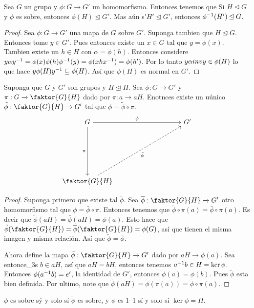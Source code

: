 \begin{lemma}\label{lemma_4.11}
    Sea $G$ un grupo y  $\phi:G \xrightarrow{} G'$ un homomorfismo. Entonces
    tenemos que Si $H \unlhd G$ y $\phi$ es sobre, entonces  $\phi(H) \unlhd G'$.
    Mas a\'un s\'$H' \unlhd G'$, entonces $\phi^{-1}(H') \unlhd G$.
\end{lemma}
\begin{proof}
    Sea $\phi:G \xrightarrow{} G'$ una mapa de $G$ sobre  $G'$. Suponga tambien
    que  $H \unlhd G$. Entonces tome  $y \in G'$. Pues entonces existe un  $x
    \in G$ tal que  $y=\phi(x)$. Tambien existe un $h \in H$ con
    $\alpha=\phi(h)$. Entonces considere
    $y\alpha y^{-1}=\phi(x)\phi(h)\phi^{-1}(y)=\phi(xhx^{-1})=\phi(h')$. Por
    lo tanto $y\alpha\\inv{y} \in \phi(H)$ lo que hace $y\phi(H)y^{-1}
    \subseteq \phi(H)$. As\'i que $\phi(H)$ es normal en $G'$.
\end{proof}

\begin{theorem}\label{thm_4.12}
    Suponga que $G$ y $G'$ son grupos y  $H \unlhd H$. Sea $\phi:G
    \xrightarrow{} G'$ y $\pi:G \xrightarrow{} \faktor{G}{H}$ dado por $\pi:a
    \xrightarrow{} aH$. Enotnces existe un u\'unico $\tilde{\phi}:\faktor{G}{H}
    \xrightarrow{} G'$ tal que $\phi=\tilde{\phi} \circ \pi$.
    \[\begin{tikzcd}
	G &&&& {G'} \\
	\\
	\\
	\\
	{\faktor{G}{H}}
	\arrow["\phi", from=1-1, to=1-5]
	\arrow["\pi"', from=1-1, to=5-1]
	\arrow["{\tilde{\phi}}"', dashed, from=5-1, to=1-5]
\end{tikzcd}\]
\end{theorem}
\begin{proof}
    Suponga primero que existe tal $\tilde{\phi}$. Sea $\bar{\phi}:\faktor{G}{H}
    \xrightarrow{} G'$ otro homomorfismo tal que $\phi=\bar{\phi} \circ \pi$.
    Entonces tenemos que $\tilde{\phi} \circ \pi(a)=\bar{\phi} \circ \pi(a)$. Es
    decir que $\tilde{\phi}(aH)=\bar{\phi}(aH)=\phi(a)$. Esto hace que
    $\tilde{\phi}(\faktor{G}{H})=\bar{\phi}(\faktor{G}{H})=\phi(G)$, as\'i que
    tienen el misma imagen y misma relaci\'on. As\'i que
    $\tilde{\phi}=\bar{\phi}$.

    Ahora define la mapa $\tilde{\phi}:\faktor{G}{H} \xrightarrow{} G'$ dado por
    $aH \xrightarrow{} \phi(a)$. Sea entonce_3s $b \in aH$, as\'i que  $aH=bH$,
    entonces tenemos  $a^{-1}b \in H=\ker{\phi}$. Entonces $\phi(a^{-1}b)=e'$,
    la identidad de $G'$, entonces  $\phi(a)=\phi(b)$. Pues $\tilde{\phi}$ esta
    bien definida. Por ultimo, note que
    $\tilde{\phi}(aH)=\tilde{\phi}(\pi(a))=\tilde{\phi} \circ \pi(a)$.
\end{proof}
\begin{corollary}
    $\phi$ es sobre s\'y y solo s\'i $\tilde{\phi}$ es sobre, y $\phi$ es  1--1
    s\'i y solo s\'i $\ker{\phi}=H$.
\end{corollary}
